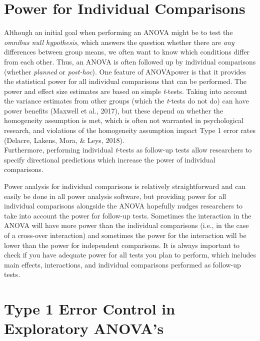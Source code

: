 \documentclass[,jou,floatsintext]{apa6}
\begin{document}
\hypertarget{power-for-individual-comparisons}{%
\section{Power for Individual Comparisons}\label{power-for-individual-comparisons}}

Although an initial goal when performing an ANOVA might be to test the \emph{omnibus null hypothesis}, which answers the question whether there are \emph{any} differences between group means, we often want to know which conditions differ from each other. Thus, an ANOVA is often followed up by individual comparisons (whether \emph{planned} or \emph{post-hoc}).
One feature of ANOVApower is that it provides the statistical power for all individual comparisons that can be performed.
The power and effect size estimates are based on simple \emph{t}-tests.
Taking into account the variance estimates from other groups (which the \emph{t}-tests do not do) can have power benefits (Maxwell et al., 2017), but these depend on whether the homogeneity assumption is met, which is often not warranted in psychological research, and violations of the homogeneity assumption impact Type 1 error rates (Delacre, Lakens, Mora, \& Leys, 2018).\\
Furthermore, performing individual \emph{t}-tests as follow-up tests allow researchers to specify directional predictions which increase the power of individual comparisons.

Power analysis for individual comparisons is relatively straightforward and can easily be done in all power analysis software, but providing power for all individual comparisons alongside the ANOVA hopefully nudges researchers to take into account the power for follow-up tests.
Sometimes the interaction in the ANOVA will have more power than the individual comparisons (i.e., in the case of a cross-over interaction) and sometimes the power for the interaction will be lower than the power for independent comparisons.
It is always important to check if you have adequate power for all tests you plan to perform, which includes main effects, interactions, and individual comparisons performed as follow-up tests.

\hypertarget{type-1-error-control-in-exploratory-anovas}{%
\section{Type 1 Error Control in Exploratory ANOVA's}\label{type-1-error-control-in-exploratory-anovas}}
\end{document}
